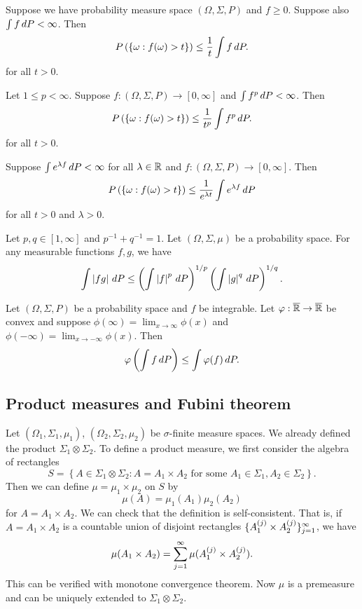 \documentclass[a4paper]{article}
\begin{document}
\begin{thm}
  Suppose we have probability measure space $(\Omega, \Sigma, P)$
  and $f \geq 0$. Suppose also $\int f \, d P < \infty$. Then
  \[
  P \left( \left\{ \omega : f(\omega) > t \right\} \right)
  \leq \frac{1}{t} \int f \, d P.
  \]
  for all $t > 0$.
\end{thm}

\begin{remark}
  Let $1 \leq p < \infty$. Suppose $f : (\Omega, \Sigma, P) \to
  [0, \infty]$ and $\int f^p \, d P < \infty$. Then
  \[
  P \left( \left\{ \omega : f (\omega) > t \right\} \right)
  \leq \frac{1}{t^p} \int f^p \, d P.
  \]
  for all $t > 0$.
\end{remark}

\begin{remark}
  Suppose $\int e^{\lambda f} \, d P < \infty$ for all
  $\lambda \in \mathbb{R}$ and $f : (\Omega, \Sigma, P) \to [0, \infty]$.
  Then
  \[
  P \left( \left\{ \omega : f (\omega) > t \right\} \right)
  \leq \frac{1}{e^{\lambda t}} \int e^{\lambda f} \, d P
  \]
  for all $t > 0$ and $\lambda > 0$.
\end{remark}

\begin{thm}
  Let $p, q \in [1, \infty]$ and $p^{-1} + q^{-1} = 1$.
  Let $(\Omega, \Sigma, \mu)$ be a probability space. For any
  measurable functions $f, g$, we have
  \[
  \int \left\lvert f g\right\rvert \, d P \leq \left( \int \left\lvert f\right\rvert^p \, d P \right)^{1 / p}
  \left( \int \left\lvert g\right\rvert^q \, d P \right)^{1 / q}.
  \]
\end{thm}

\begin{thm}
  Let $(\Omega, \Sigma, P)$ be a probability space and $f$ be
  integrable. Let $\varphi : \overline{\mathbb{R}} \to \overline{\mathbb{R}}$ be convex
  and suppose $\phi (\infty) = \lim_{x \to \infty} \phi(x)$
  and $\phi (-\infty) = \lim_{x \to -\infty} \phi(x)$. Then
  \[
  \varphi \left( \int f \, d P \right) \leq \int \varphi (f) \, d P.
  \]
\end{thm}

\subsection{Product measures and Fubini theorem}
Let $(\Omega_1, \Sigma_1, \mu_1)$, $(\Omega_2, \Sigma_2, \mu_2)$
be $\sigma$-finite measure spaces. We already defined the product
$\Sigma_1 \otimes \Sigma_2$. To define a product measure, we first
consider the algebra of rectangles
\[
S = \left\{ A \in \Sigma_1 \otimes \Sigma_2 : A = A_1 \times A_2
\text{ for some $A_1 \in \Sigma_1, A_2 \in \Sigma_2$} \right\}.
\]
Then we can define $\mu = \mu_1 \times \mu_2$ on $S$ by
\[
\mu (A) = \mu_1 (A_1) \mu_2 (A_2)
\]
for $A = A_1 \times A_2$. We can check that the definition is
self-consistent. That is, if $A = A_1 \times A_2$ is a countable
union of disjoint rectangles
$\{ A_1^{(j)} \times A_2^{(j)} \}_{j=1}^\infty$, we have
\[
\mu (A_1 \times A_2) = \sum_{j=1}^\infty \mu ( A_1^{(j)} \times A_2^{(j)} ).
\]
This can be verified with monotone convergence theorem.
Now $\mu$ is a premeasure and can be uniquely
extended to $\Sigma_1 \otimes \Sigma_2$.
\end{document}
